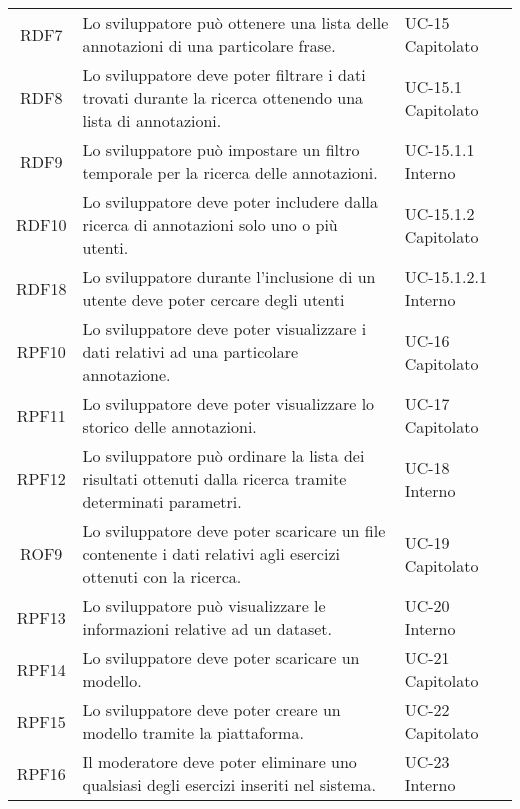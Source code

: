\begin{tabularx}{\textwidth}{| c | p{10cm} | X |}
		RDF7 & Lo sviluppatore può ottenere una lista delle annotazioni di una particolare frase. & UC-15 \newline Capitolato\\
		RDF8 & Lo sviluppatore deve poter filtrare i dati trovati durante la ricerca ottenendo una lista di annotazioni. & UC-15.1 \newline Capitolato\\
		RDF9 & Lo sviluppatore può impostare un filtro temporale per la ricerca delle annotazioni. & UC-15.1.1 \newline Interno\\
		RDF10 & Lo sviluppatore deve poter includere dalla ricerca di annotazioni solo uno o più utenti. & UC-15.1.2 \newline Capitolato\\
		RDF18 & Lo sviluppatore durante l'inclusione di un utente deve poter cercare degli utenti & UC-15.1.2.1 \newline Interno\\		
		RPF10 & Lo sviluppatore deve poter visualizzare i dati relativi ad una particolare annotazione. & UC-16 \newline Capitolato\\
		RPF11 & Lo sviluppatore deve poter visualizzare lo storico delle annotazioni. & UC-17 \newline Capitolato\\
		RPF12 & Lo sviluppatore può ordinare la lista dei risultati ottenuti dalla ricerca tramite determinati parametri. & UC-18 \newline Interno\\	
		ROF9 & Lo sviluppatore deve poter scaricare un file contenente i dati relativi agli esercizi ottenuti con la ricerca. & UC-19 \newline Capitolato\\
		RPF13 & Lo sviluppatore può visualizzare le informazioni relative ad un dataset. & UC-20 \newline Interno\\
		RPF14 & Lo sviluppatore deve poter scaricare un modello. & UC-21 \newline Capitolato\\
		RPF15 & Lo sviluppatore deve poter creare un modello tramite la piattaforma. & UC-22 \newline Capitolato\\ 
		RPF16 & Il moderatore deve poter eliminare uno qualsiasi degli esercizi inseriti nel sistema. & UC-23 \newline Interno\\

\end{tabularx}
